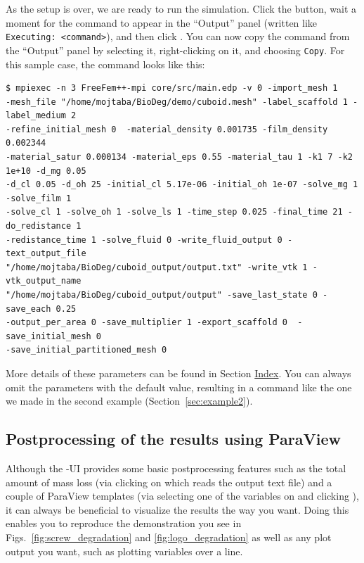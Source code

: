 As the setup is over, we are ready to run the simulation. Click the  button, wait a moment for the command to appear in the ``Output'' panel (written  like \verb|Executing: <command>|), and then click . You can now copy the command from the ``Output'' panel by selecting it, right-clicking on it, and choosing \verb|Copy|. For this sample case, the command looks like this:

\begin{verbatim}
$ mpiexec -n 3 FreeFem++-mpi core/src/main.edp -v 0 -import_mesh 1
-mesh_file "/home/mojtaba/BioDeg/demo/cuboid.mesh" -label_scaffold 1 -label_medium 2
-refine_initial_mesh 0  -material_density 0.001735 -film_density 0.002344
-material_satur 0.000134 -material_eps 0.55 -material_tau 1 -k1 7 -k2 1e+10 -d_mg 0.05
-d_cl 0.05 -d_oh 25 -initial_cl 5.17e-06 -initial_oh 1e-07 -solve_mg 1 -solve_film 1
-solve_cl 1 -solve_oh 1 -solve_ls 1 -time_step 0.025 -final_time 21 -do_redistance 1
-redistance_time 1 -solve_fluid 0 -write_fluid_output 0 -text_output_file
"/home/mojtaba/BioDeg/cuboid_output/output.txt" -write_vtk 1 -vtk_output_name
"/home/mojtaba/BioDeg/cuboid_output/output" -save_last_state 0 -save_each 0.25
-output_per_area 0 -save_multiplier 1 -export_scaffold 0  -save_initial_mesh 0
-save_initial_partitioned_mesh 0
\end{verbatim}

More details of these parameters can be found in Section \hyperref[sec:index]{Index}. You can always omit the parameters with the default value, resulting in a command like the one we made in the second example (Section~\ref{sec:example2}).

\subsection{Postprocessing of the results using ParaView} \label{sec:postprocess}

Although the \biodeg{}-UI provides some basic postprocessing features such as the total amount of mass loss (via clicking on  which reads the output text file) and a couple of ParaView templates (via selecting one of the variables on  and clicking ), it can always  be beneficial to visualize the results the way you want. Doing this enables you to reproduce the demonstration you see in Figs.~\ref{fig:screw_degradation} and \ref{fig:logo_degradation} as well as any plot output you want, such as plotting variables over a line.

